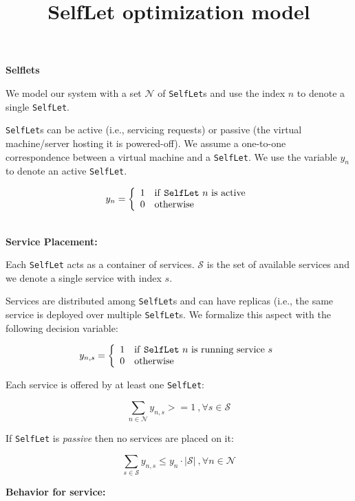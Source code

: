 \documentclass[11pt]{amsart}
\title{SelfLet optimization model}
\newcommand{\slet}{\texttt{SelfLet}}
\newcommand{\moreslet}{\texttt{SelfLet}s}
\begin{document}
\maketitle

{\bf Selflets}

We model our system with a set $\mathcal{N}$ of \moreslet{} and use the index $n$ to denote a single \slet{}. 

\moreslet{} can be active (i.e., servicing requests) or passive (the virtual machine/server hosting it is powered-off). We assume a one-to-one correspondence between a virtual machine and a \slet{}. We use the variable $y_n$ to denote an active \slet{}. 


$$
y_{n} = \left\{ 
	\begin{array}{rl}
	1 & \mbox{if \slet{} $n$ is active} \\
	0 & \mbox{otherwise} 
	\end{array} \right.
$$


\\

{\bf Service Placement:}

Each \slet{} acts as a container of services. $\mathcal{S}$ is the set of available services and we denote a single service with index $s$. 

Services are distributed among \moreslet{} and can have replicas (i.e., the same service is deployed over multiple \moreslet{}. We formalize this aspect with the following decision variable:

$$
y_{n,s} = \left\{ 
	\begin{array}{rl}
	1 & \mbox{if \slet{} $n$ is running service $s$} \\
	0 & \mbox{otherwise} 
	\end{array} \right.
$$

Each service is offered by at least one \slet{}: 

$$
\sum_{n \in \mathcal{N}} y_{n,s} >= 1 \:, \forall s \in \mathcal{S}
$$



If \slet{} is \emph{passive} then  no services are placed on it:

$$
\sum_{s \in \mathcal{S}} y_{n,s} \leq y_n \cdot |\mathcal{S}| \:, \forall n \in \mathcal{N}
$$


{\bf Behavior for service:}
\end{document}
